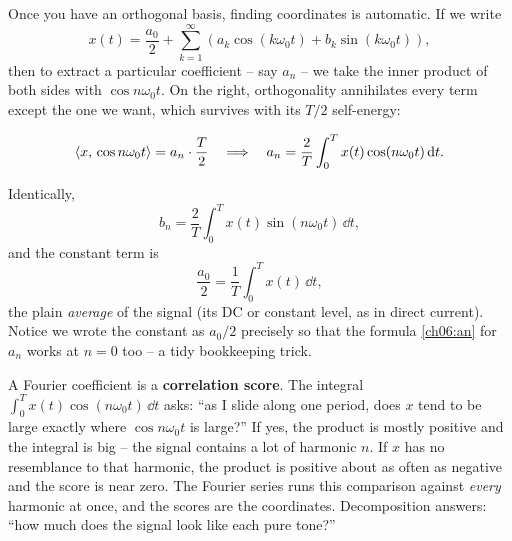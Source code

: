 Once you have an orthogonal basis, finding coordinates is automatic. If we write
\[
x(t) = \frac{a_0}{2} + \sum_{k=1}^{\infty}(a_k\cos(k\omega_0 t) + b_k\sin(k\omega_0 t)),
\]
then
to extract a particular coefficient -- say \(a_n\) -- we take the inner product of both
sides with \(\cos n\omega_0 t\). On the right, orthogonality annihilates every term except
the one we want, which survives with its \(T/2\) self-energy:

\begin{equation}
\langle x,\, \cos n\omega_0 t \rangle = a_n \cdot \frac{T}{2}
\quad\Longrightarrow\quad
a_n = \frac{2}{T}\int_{0}^{T} x(t)\cos(n\omega_0 t)\,\mathrm{d} t.
\label{ch06:an}
\end{equation}

Identically,
\[
b_n = \frac{2}{T}\int_0^T x(t)\sin(n\omega_0 t)\,\dd t,
\]
and the constant term is
\[
\frac{a_0}{2} = \frac{1}{T}\int_0^T x(t)\,\dd t,
\]
the plain \emph{average} of the signal (its DC or constant level, as in direct current). Notice we wrote the constant as \(a_0/2\) precisely so that the
formula \eqref{ch06:an} for \(a_n\) works at \(n=0\) too -- a tidy bookkeeping trick.

\begin{happeningbox}
A Fourier coefficient is a \textbf{correlation score}. The integral
\(\int_0^T x(t)\cos(n\omega_0 t)\,\dd t\) asks: ``as I slide along one period, does \(x\)
tend to be large exactly where \(\cos n\omega_0 t\) is large?'' If yes, the product is
mostly positive and the integral is big -- the signal contains a lot of harmonic \(n\).
If \(x\) has no resemblance to that harmonic, the product is positive about as often as
negative and the score is near zero. The Fourier series runs this comparison against
\emph{every} harmonic at once, and the scores are the coordinates. Decomposition answers:
``how much does the signal look like each pure tone?''
\end{happeningbox}

